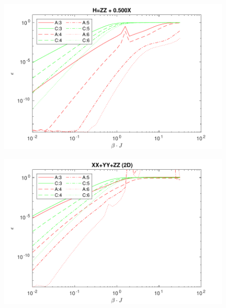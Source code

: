 \documentclass[aspectratio=169]{beamer}
\begin{document}
\begin{frame}
    \begin{figure}
        \includegraphics[scale=0.6]{Figures/1D_ising.pdf}
    \end{figure}
\end{frame}


\begin{frame}
    \begin{figure}
        \includegraphics[scale=0.6]{Figures/1D_heis.pdf}
    \end{figure}
\end{frame}
\end{document}
